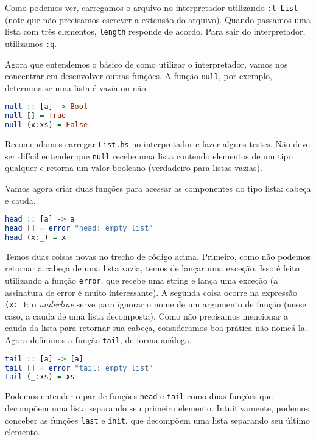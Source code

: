 \documentclass[a4paper]{article}
\begin{document}
Como podemos ver, carregamos o arquivo no interpretador utilizando \texttt{:l List} (note que não precisamos escrever a extensão do arquivo).
Quando passamos uma lista com três elementos, \texttt{length} responde de acordo.
Para sair do interpretador, utilizamos \texttt{:q}.

Agora que entendemos o básico de como utilizar o interpretador, vamos nos concentrar em desenvolver outras funções.
A função \texttt{null}, por exemplo, determina se uma lista é vazia ou não.

\begin{lstlisting}[language=haskell, frame=single]
null :: [a] -> Bool
null [] = True
null (x:xs) = False
\end{lstlisting}

Recomendamos carregar \texttt{List.hs} no interpretador e fazer alguns testes.
Não deve ser difícil entender que \texttt{null} recebe uma lista contendo elementos de um tipo qualquer e retorna um valor booleano (verdadeiro para listas vazias).

Vamos agora criar duas funções para acessar as componentes do tipo lista: cabeça e cauda.

\begin{lstlisting}[language=haskell, frame=single]
head :: [a] -> a
head [] = error "head: empty list"
head (x:_) = x
\end{lstlisting}

Temos duas coisas novas no trecho de código acima.
Primeiro, como não podemos retornar a cabeça de uma lista vazia, temos de lançar uma exceção.
Isso é feito utilizando a função \texttt{error}, que recebe uma string e lança uma exceção (a assinatura de error é muito interessante).
A segunda coisa ocorre na expressão \texttt{(x:\_)}: o \emph{underline} serve para ignorar o nome de um argumento de função (nesse caso, a cauda de uma lista decomposta).
Como não precisamos mencionar a cauda da lista para retornar sua cabeça, consideramos boa prática não nomeá-la.
Agora definimos a função \texttt{tail}, de forma análoga.

\begin{lstlisting}[language=haskell, frame=single]
tail :: [a] -> [a]
tail [] = error "tail: empty list"
tail (_:xs) = xs
\end{lstlisting}

Podemos entender o par de funções \texttt{head} e \texttt{tail} como duas funções que decompõem uma lista separando seu primeiro elemento.
Intuitivamente, podemos conceber as funções \texttt{last} e \texttt{init}, que decompõem uma lista separando seu último elemento.
\end{document}
